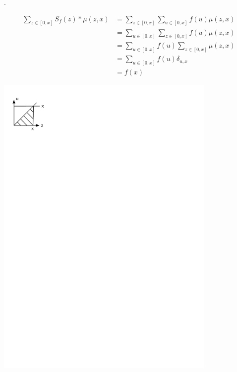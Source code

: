 \Proof.
\begin{minipage}[t]{0.6\textwidth}
  \begin{align*}
      \sum_{z \in [0,x]} S_f(z) * \mu(z,x)
      &= \sum_{z \in [0,x]} \sum_{u \in [0,x]} f(u) \mu(z,x) \\
      &= \sum_{u \in [0,x]} \sum_{z \in [0,x]} f(u) \mu(z,x) \\
      &= \sum_{u \in [0,x]} f(u) \sum_{z \in [0,x]} \mu(z,x) \\
      &= \sum_{u \in [0,x]} f(u) \delta_{u,x} \\
      &= f(x)
  \end{align*}
\end{minipage}
\begin{minipage}[t]{0.3\textwidth}
  \vspace{1.2cm}
  \begin{center}
    \includegraphics[width=0.8\textwidth]
      {02_higher_combinatorics/pics/MoebiusSum}
  \end{center}
\end{minipage}
